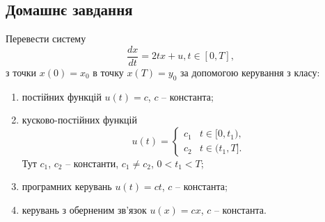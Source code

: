 
\subsection{Домашнє завдання}

\begin{problem}
    Перевести систему 
    \[ \dfrac{dx}{dt} = 2tx + u, t \in [0, T], \]
    з точки $x(0) = x_0$ в точку $x(T) = y_0$ за допомогою керування з класу:
    \begin{enumerate}
        \item постійних функцій $u(t) = c$, $c$ -- константа; 
        \item кусково-постійних функцій 
        \[
        u(t) = \begin{cases}
            c_1 & t \in [0, t_1), \\
            c_2 & t \in (t_1, T].
        \end{cases}
        \]
        Тут $c_1$, $c_2$ -- константи, $c_1 \ne c_2$, $0 < t_1 < T$;
        \item програмних керувань $u(t) = ct$, $c$ -- константа;
        \item керувань з оберненим зв'язок $u(x) = cx$, $c$ -- константа.
    \end{enumerate}
\end{problem}

